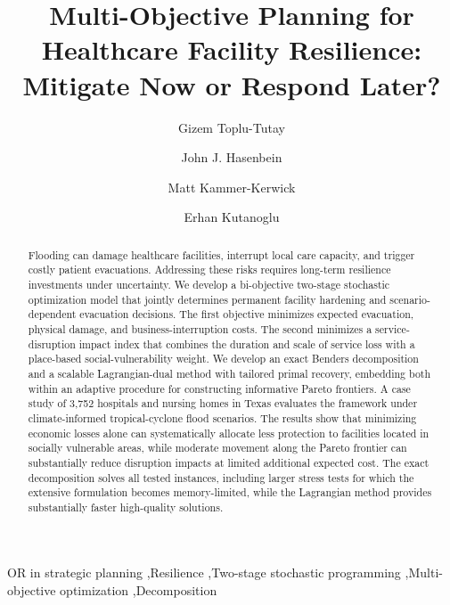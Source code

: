 \documentclass[preprint,11pt,authoryear]{elsarticle}
\begin{document}
\begin{frontmatter}

\title{Multi-Objective Planning for Healthcare Facility Resilience: Mitigate Now or Respond Later?}


\author[ut]{Gizem Toplu-Tutay}
\author[ut]{John J. Hasenbein}
\author[bbr]{Matt Kammer-Kerwick}
\author[ut]{Erhan Kutanoglu}

            

\begin{abstract}
Flooding can damage healthcare facilities, interrupt local care capacity, and trigger costly patient evacuations. Addressing these risks requires long-term resilience investments under uncertainty. We develop a bi-objective two-stage stochastic optimization model that jointly determines permanent facility hardening and scenario-dependent evacuation decisions. The first objective minimizes expected evacuation, physical damage, and business-interruption costs. The second minimizes a service-disruption impact index that combines the duration and scale of service loss with a place-based social-vulnerability weight. We develop an exact Benders decomposition and a scalable Lagrangian-dual method with tailored primal recovery, embedding both within an adaptive procedure for constructing informative Pareto frontiers. A case study of 3,752 hospitals and nursing homes in Texas evaluates the framework under climate-informed tropical-cyclone flood scenarios. The results show that minimizing economic losses alone can systematically allocate less protection to facilities located in socially vulnerable areas, while moderate movement along the Pareto frontier can substantially reduce disruption impacts at limited additional expected cost. The exact decomposition solves all tested instances, including larger stress tests for which the extensive formulation becomes memory-limited, while the Lagrangian method provides substantially faster high-quality solutions.
\end{abstract}

\begin{keyword}
OR in strategic planning \sep Resilience \sep Two-stage stochastic programming \sep Multi-objective optimization \sep Decomposition
\end{keyword}

\end{frontmatter}
\end{document}
